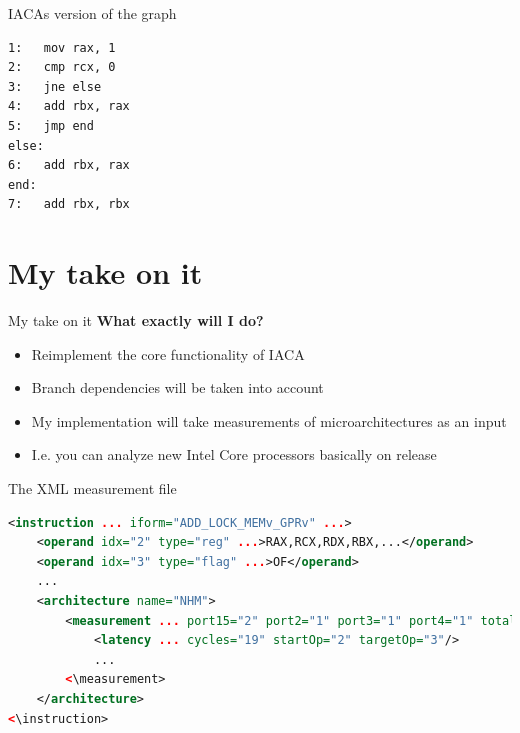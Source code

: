 \documentclass[10pt, tikz,border=2mm, xcolor=dvipsnames]{beamer}
\begin{document}
\begin{frame}[fragile]{IACAs version of the graph}

\begin{minipage}{.35\textwidth}
  \begin{verbatim}
1:   mov rax, 1
2:   cmp rcx, 0
3:   jne else
4:   add rbx, rax
5:   jmp end
else:
6:   add rbx, rax
end:
7:   add rbx, rbx
\end{verbatim}
\end{minipage}%
\begin{minipage}{.5\textwidth}
  
\end{minipage}

\end{frame}

\section{My take on it}

\begin{frame}{My take on it}
\textbf{What exactly will I do?}
\begin{itemize}[<+- | alert@+>]
    \item Reimplement the core functionality of IACA
    \item Branch dependencies will be taken into account
    \item My implementation will take measurements of microarchitectures as an input
    \item I.e. you can analyze new Intel Core processors basically on release
\end{itemize}
\end{frame}

\begin{frame}[fragile]{The XML measurement file}
\begin{lstlisting}[language=XML, basicstyle=\ttfamily\scriptsize, breaklines=true]
<instruction ... iform="ADD_LOCK_MEMv_GPRv" ...>
    <operand idx="2" type="reg" ...>RAX,RCX,RDX,RBX,...</operand>
    <operand idx="3" type="flag" ...>OF</operand>
    ...
    <architecture name="NHM">
        <measurement ... port15="2" port2="1" port3="1" port4="1" total_uops="5">
            <latency ... cycles="19" startOp="2" targetOp="3"/>
            ...
        <\measurement>
    </architecture>
<\instruction>
\end{lstlisting}
\end{frame}
\end{document}
